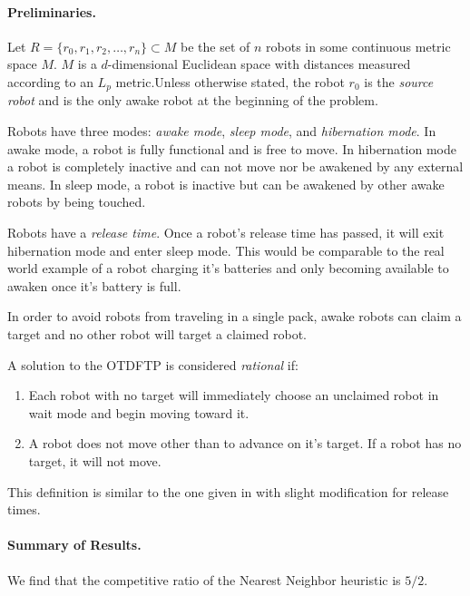 \documentclass[twoside]{article}
\begin{document}
\begin{multicols}{2}
\paragraph{Preliminaries.}
Let $R = \{r_0, r_1, r_2, \dots , r_n \} \subset M$ be the set of $n$ robots in some continuous metric space $M$. $M$ is a $d$-dimensional Euclidean space with distances measured according to an $L_p$ metric.Unless otherwise stated, the robot $r_0$ is the \textit{source robot} and is the only awake robot at the beginning of the problem. 

Robots have three modes: \textit{awake mode}, \textit{sleep mode}, and \textit{hibernation mode}. In awake mode, a robot is fully functional and is free to move. In hibernation mode a robot is completely inactive and can not move nor be awakened by any external means. In sleep mode, a robot is inactive but can be awakened by other awake robots by being touched.

Robots have a \textit{release time}. Once a robot's release time has passed, it will exit hibernation mode and enter sleep mode. This would be comparable to the real world example of a robot charging it's batteries and only becoming available to awaken once it's battery is full.

In order to avoid robots from traveling in a single pack, awake robots can claim a target and no other robot will target a claimed robot. \cite{FTP.2}

A solution to the OTDFTP is considered \textit{rational} if:
\begin{enumerate}
	\item Each robot with no target will immediately choose an unclaimed robot in wait mode and begin moving toward it.
	\item A robot does not move other than to advance on it's target. If a robot has no target, it will not move.
\end{enumerate}
This definition is similar to the one given in \cite{FTP.0} with slight modification for release times.
\paragraph{Summary of Results.}
We find that the competitive ratio of the Nearest Neighbor heuristic is $5/2$.


\end{multicols}
\end{document}
